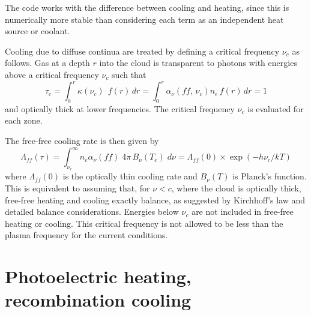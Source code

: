 The code works with the difference between cooling and heating, since
this is numerically more stable than considering each term as an independent
heat source or coolant.

Cooling due to diffuse continua are treated by defining a critical
frequency $\nu_c$ as follows.  Gas at a depth $r$ into the cloud is transparent
to photons with energies above a critical frequency $\nu_c$ such that
\begin{equation}
{\tau _c} = \int_0^r {\kappa \left( {{\nu _c}} \right)\;\,f\left( r
\right)\,dr}  = \int_0^r {{\alpha _\nu }} \left( {ff,\,{\nu _c}}
\right){n_e}\,f\left( r \right)\,dr = 1
\end{equation}
and optically thick at lower frequencies.
The critical frequency $\nu_c$ is
evaluated for each zone.

The free-free cooling rate is then given by
\begin{equation}
{\Lambda _{ff}}\left( \tau  \right) = \int_{{\nu _c}}^\infty  {{n_e}{\alpha
_\nu }(ff)\;4\pi \,{B_\nu }\left( {{T_e}} \right)\;d\nu  = {\Lambda _{ff}}(0)
\times \exp \left( { - h{\nu _c}/kT} \right)}
\end{equation}
where $\Lambda_{ff}(0)$ is the optically thin cooling rate and $B_\nu (T)$ is Planck's
function.  This is equivalent to assuming that, for $\nu < c$, where the cloud
is optically thick, free-free heating and cooling exactly balance, as
suggested by Kirchhoff's law and detailed balance considerations.   Energies
below $\nu_c$ are not included in free-free heating or cooling.  This critical
frequency is not allowed to be less than the plasma frequency for the current
conditions.

\section{Photoelectric heating, recombination cooling}

